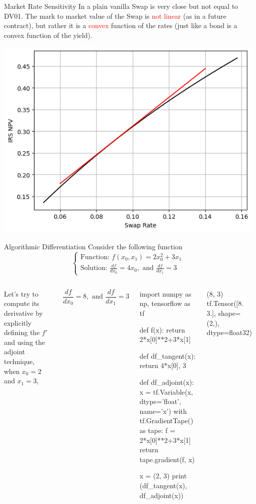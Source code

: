 \documentclass{beamer}
\begin{document}
\begin{frame}{Market Rate Sensitivity}
In a plain vanilla Swap is very close but not equal to DV01. The mark to market value of the Swap is \textcolor{red}{not linear} (as in a future contract), but rather it is a \textcolor{red}{convex} function of the rates (just like a bond is a convex function of the yield).
\begin{center}
\includegraphics[width=0.5\linewidth]{images/dv01}
\end{center}
\end{frame}

\begin{frame}[fragile]{Algorithmic Differentiation}
Consider the following function
\begin{equation*}
\begin{cases}
\text{Function: } f(x_0, x_1) = 2x_0^2 + 3x_1\\
\text{Solution: } \frac{df}{dx_0} = 4x_0, \text{ and } \frac{df}{dx_1}=3
\end{cases}
\end{equation*}
\begin{columns}
Let's try to compute its derivative by explicitly defining the $f'$ and using the adjoint technique, when $x_0=2$ and $x_1=3$,

\begin{equation*}
\frac{df}{dx_0} = 8, \text{ and } \frac{df}{dx_1}=3
\end{equation*}
\begin{ipython}
import numpy as np, tensorflow as tf

def f(x):
  return 2*x[0]**2+3*x[1]

def df_tangent(x):
  return 4*x[0], 3

def df_adjoint(x):
  x = tf.Variable(x, dtype='float', name='x')
  with tf.GradientTape() as tape:
    f = 2*x[0]**2+3*x[1]
  return tape.gradient(f, x)

x = (2, 3)
print (df_tangent(x), df_adjoint(x))
\end{ipython}
\begin{ioutput}

(8, 3) tf.Tensor([8. 3.], shape=(2,), dtype=float32)
\end{ioutput}
\end{columns}
\end{frame}
\end{document}
